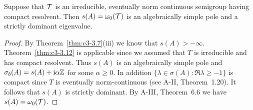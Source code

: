 \begin{corollary}\label{cor:c3-3.17}
	Suppose that $\mathcal{T}$ is an irreducible, eventually norm continuous semigroup having compact resolvent.
	Then $s(A) = \omega_0(\mathcal{T})$ is an algebraically simple pole and a strictly dominant eigenvalue.
\end{corollary}
\begin{proof}
	By Theorem~\ref{thm:c3-3.7}(iii) we know that $s(A) > -\infty$. 
	Theorem~\ref{thm:c3-3.12} is applicable since we assumed that $T$ is irreducible and has compact resolvent.
	Thus $s(A)$ is an algebraically simple pole and $\sigma_{b}(A) = s(A) + \mathrm{i}\alpha\mathbb{Z}$ for some $\alpha \geq 0$. 
	In addition $\{\lambda \in \sigma(A) \colon \Re \lambda \geq -1\}$ is compact since $T$ is eventually norm-continuous (see A-II, Theorem~1.20). 
	It follows that $s(A)$ is strictly dominant.
	By A-III, Theorem~6.6 we have $s(A) = \omega_0(\mathcal{T})$.
\end{proof}

